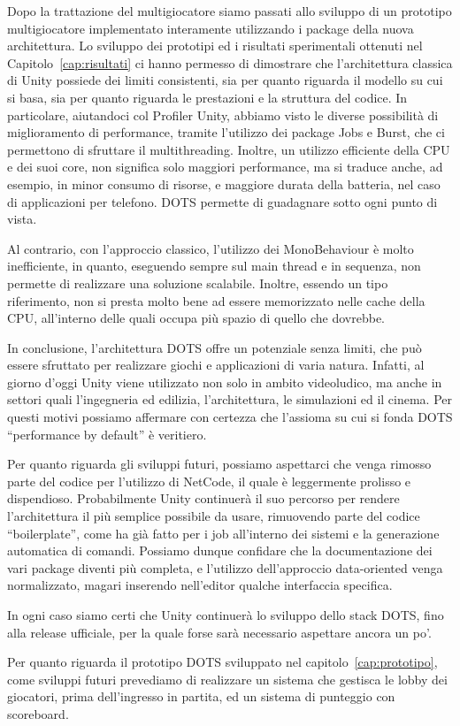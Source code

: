 Dopo la trattazione del multigiocatore siamo passati allo sviluppo di un prototipo multigiocatore implementato interamente utilizzando i package della nuova architettura.
Lo sviluppo dei prototipi ed i risultati sperimentali ottenuti nel Capitolo~\ref{cap:risultati} ci hanno permesso di dimostrare che l'architettura classica di Unity possiede dei limiti consistenti, sia per quanto riguarda il modello su cui si basa, sia per quanto riguarda le prestazioni e la struttura del codice. In particolare, aiutandoci col Profiler Unity, abbiamo visto le diverse possibilità di miglioramento di performance, tramite l'utilizzo dei package Jobs e Burst, che ci permettono di sfruttare il multithreading. Inoltre, un utilizzo efficiente della CPU e dei suoi core, non significa solo maggiori performance, ma si traduce anche, ad esempio, in minor consumo di risorse, e maggiore durata della batteria, nel caso di applicazioni per telefono. DOTS permette di guadagnare sotto ogni punto di vista.

Al contrario, con l'approccio classico, l'utilizzo dei MonoBehaviour è molto inefficiente, in quanto, eseguendo sempre sul main thread e in sequenza, non permette di realizzare una soluzione scalabile. Inoltre, essendo un tipo riferimento, non si presta molto bene ad essere memorizzato nelle cache della CPU, all'interno delle quali occupa più spazio di quello che dovrebbe.

In conclusione, l'architettura DOTS offre un potenziale senza limiti, che può essere sfruttato per realizzare giochi e applicazioni di varia natura. Infatti, al giorno d'oggi Unity viene utilizzato non solo in ambito videoludico, ma anche in settori quali l'ingegneria ed edilizia, l'architettura, le simulazioni ed il cinema.
Per questi motivi possiamo affermare con certezza che l'assioma su cui si fonda DOTS ``performance by default'' è veritiero.

Per quanto riguarda gli sviluppi futuri, possiamo aspettarci che venga rimosso parte del codice per l'utilizzo di NetCode, il quale è leggermente prolisso e dispendioso. Probabilmente Unity continuerà il suo percorso per rendere l'architettura il più semplice possibile da usare, rimuovendo parte del codice ``boilerplate'', come ha già fatto per i job all'interno dei sistemi e la generazione automatica di comandi.
Possiamo dunque confidare che la documentazione dei vari package diventi più completa, e l'utilizzo dell'approccio data-oriented venga normalizzato, magari inserendo nell'editor qualche interfaccia specifica.

In ogni caso siamo certi che Unity continuerà lo sviluppo dello stack DOTS, fino alla release ufficiale, per la quale forse sarà necessario aspettare ancora un po'.

Per quanto riguarda il prototipo DOTS sviluppato nel capitolo~\ref{cap:prototipo}, come sviluppi futuri prevediamo di realizzare un sistema che gestisca le lobby dei giocatori, prima dell'ingresso in partita, ed un sistema di punteggio con scoreboard.
